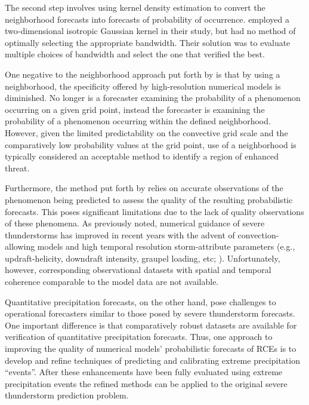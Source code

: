 The second step involves using kernel density estimation to convert the neighborhood forecasts into forecasts of probability of occurrence.
\cite{Sobash2011} employed a two-dimensional isotropic Gaussian kernel in their study, but had no method of optimally selecting the appropriate bandwidth.
Their solution was to evaluate multiple choices of bandwidth and select the one that verified the best.


One negative to the neighborhood approach put forth by \cite{Sobash2011} is that by using a neighborhood, the specificity offered by high-resolution numerical models is diminished.
No longer is a forecaster examining the probability of a phenomenon occurring on a given grid point, instead the forecaster is examining the probability of a phenomenon occurring within the defined neighborhood.
However, given the limited predictability on the convective grid scale and the comparatively low probability values at the grid point, use of a neighborhood is typically considered an acceptable method to identify a region of enhanced threat.


Furthermore, the method put forth by \cite{Sobash2011} relies on accurate observations of the phenomenon being predicted to assess the quality of the resulting probabilistic forecasts.
This poses significant limitations due to the lack of quality observations of these phenomena.
As previously noted, numerical guidance of severe thunderstorms has improved in recent years with the advent of convection-allowing models and high temporal resolution storm-attribute parameters (e.g., updraft-helicity, downdraft intensity, graupel loading, etc; \citealp{Kain2010}).
Unfortunately, however, corresponding observational datasets with spatial and temporal coherence comparable to the model data are not available.


Quantitative precipitation forecasts, on the other hand, pose challenges to operational forecasters similar to those posed by severe thunderstorm forecasts.
One important difference is that comparatively robust datasets are available for verification of quantitative precipitation forecasts.
Thus, one approach to improving the quality of numerical models' probabilistic forecasts of RCEs is to develop and refine techniques of predicting and calibrating extreme precipitation ``events''.
After these enhancements have been fully evaluated using extreme precipitation events the refined methods can be applied to the original severe thunderstorm prediction problem.


